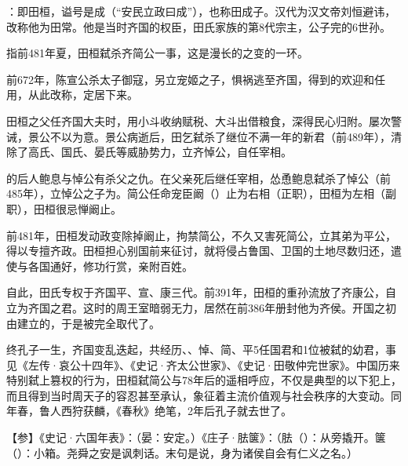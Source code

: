 {
\item {}：即田桓，谥号是成（“安民立政曰成”），也称田成子。汉代为汉文帝刘恒避讳，改称他为田常。他是当时齐国的权臣，田氏家族的第8代宗主，公子完的6世孙。

指前481年夏，田桓弑杀齐简公一事，这是漫长的之变的一环。
\begin{lyenumerate}
\item 前672年，陈宣公杀太子御寇，另立宠姬之子，惧祸逃至齐国，得到的欢迎和任用，从此改称，定居下来。
\item 田桓之父任齐国大夫时，用小斗收纳赋税、大斗出借粮食，深得民心归附。屡次警诫，景公不以为意。景公病逝后，田乞弑杀了继位不满一年的新君（前489年），清除了高氏、国氏、晏氏等威胁势力，立齐悼公，自任宰相。
\item {}的后人鲍息与悼公有杀父之仇。在父亲死后继任宰相，怂恿鲍息弑杀了悼公（前485年），立悼公之子为。简公任命宠臣阚（）止为右相（正职），田桓为左相（副职），田桓很忌惮阚止。
\item 前481年，田桓发动政变除掉阚止，拘禁简公，不久又害死简公，立其弟为平公，得以专擅齐政。田桓担心别国前来征讨，就将侵占鲁国、卫国的土地尽数归还，遣使与各国通好，修功行赏，亲附百姓。
\item 自此，田氏专权于齐国平、宣、康三代。前391年，田桓的重孙流放了齐康公，自立为齐国之君。这时的周王室暗弱无力，居然在前386年册封他为齐侯。开国之初由建立的，于是被完全取代了。
\end{lyenumerate}
终孔子一生，齐国变乱迭起，共经历、、悼、简、平5任国君和1位被弑的幼君，事见《左传·哀公十四年》、《史记·齐太公世家》、《史记·田敬仲完世家》。中国历来特别弑上篡权的行为，田桓弑简公与78年后的遥相呼应，不仅是典型的以下犯上，而且得到当时周天子的容忍甚至承认，象征着主流价值观与社会秩序的大变动。同年春，鲁人西狩获麟，《春秋》绝笔，2年后孔子就去世了。%

【参】《史记·六国年表》：（晏：安定。）《庄子·胠箧》：（胠（）：从旁撬开。箧（）：小箱。尧舜之安是讽刺话。末句是说，身为诸侯自会有仁义之名。）

}
